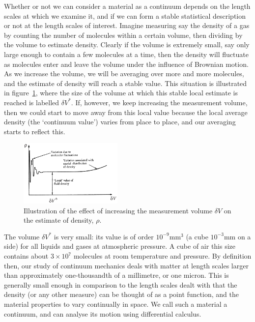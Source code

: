 \documentclass[a4paper,11pt]		{report}
\begin{document}
Whether or not we can consider a material as a continuum depends on
the length scales at which we examine it, and if we can form a stable
statistical description or not at the length scales of interest.
Imagine measuring say the density of a gas by counting the number of
molecules within a certain volume, then dividing by the volume to
estimate density. Clearly if the volume is extremely small, say only
large enough to contain a few molecules at a time, then the density
will fluctuate as molecules enter and leave the volume under the
influence of Brownian motion. As we increase the volume, we will be
averaging over more and more molecules, and the estimate of density
will reach a stable value. This situation is illustrated in
figure~\ref{fig.bat2}, where the size of the volume at which this
stable local estimate is reached is labelled $\delta V^\ast$. If,
however, we keep increasing the measurement volume, then we could
start to move away from this local value because the local average
density (the `continuum value') varies from place to place, and our
averaging starts to reflect this.

\begin{figure}
\begin{center}
\includegraphics[bb=10 15 245 167,clip,width=0.45\textwidth]{Bat-1.2.1-mod.eps}
\end{center}
\caption{Illustration of the effect of increasing the measurement
  volume $\delta V$ on the estimate of density,
  $\rho$. \citep[After][]{bat67}}
\label{fig.bat2}
\end{figure}

The volume $\delta V^\ast$ is very small: its value is of order
$10^{-9}$mm$^3$ (\ie a cube $10^{-3}$mm on a side) for all liquids and
gases at atmospheric pressure. A cube of air this size contains about
$3\times10^{7}$ molecules at room temperature and pressure. By
definition then, our study of continuum mechanics deals with matter at
length scales larger than approximately one-thousandth of a
millimetre, or one micron. This is generally small enough in
comparison to the length scales dealt with that the density (or any
other measure) can be thought of as a point function, and the material
properties to vary continually in space. We call such a material a
continuum, and can analyse its motion using differential calculus.
\end{document}

